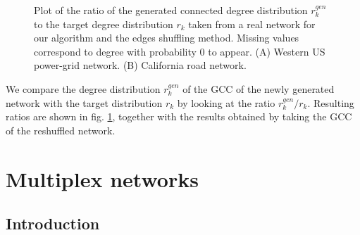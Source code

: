 \documentclass[
11pt, %
english, %
singlespacing, %
nolistspacing, %
liststotoc, %
headsepline, %
]{MastersDoctoralThesis} %
\begin{document}
\begin{figure}
	\hfill
	\caption{Plot of the ratio of the generated connected degree distribution $r^{gen}_k$ to the target degree distribution $r_k$ taken from a real network for our algorithm and the edges shuffling method. Missing values correspond to degree with probability $0$ to appear. (A) Western US power-grid network. (B) California road network.}
	\label{Figure: Real examples}
\end{figure}

We compare the degree distribution $r^{gen}_k$ of the GCC of the newly generated network with the target distribution $r_k$ by looking at the ratio $r^{gen}_k / r_k$. Resulting ratios are shown in fig. \ref{Figure: Real examples}, together with the results obtained by taking the GCC of the reshuffled network.


\chapter{Multiplex networks}
\label{Section: Multiplex networks}

\section{Introduction}

\end{document}
